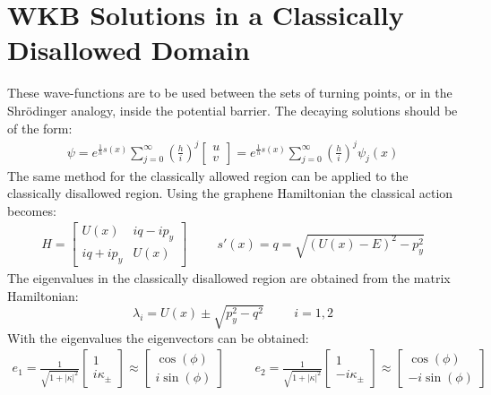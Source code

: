 		\section{WKB Solutions in a Classically Disallowed Domain}
		\label{WKB Potential Barrier - WKB Solutions in a Classicaly Disallowed Domain}
			These wave-functions are to be used between the sets of turning points, or in the Shr{\" o}dinger analogy, inside the potential barrier. The decaying solutions should be of the form:
			\begin{align}
				\psi=
				 e^{\frac{1}{h}s\left(x\right)}\sum\limits_{j=0}^\infty\left(\frac{h}{i}\right)^{j}
				\left[\begin{array}{cc}
					u\\
					v
				\end{array}\right]
				= e^{\frac{1}{h}s\left(x\right)}\sum\limits_{j=0}^\infty\left(\frac{h}{i}\right)^{j}\psi_{j}\left(x\right)
			\end{align}
			The same method for the classically allowed region can be applied to the classically disallowed region. Using the graphene Hamiltonian the classical action becomes:
			\begin{gather}
				H=
				\left[\begin{array}{cc}
					U\left(x\right)&iq-ip_{y}\\
					iq+ip_{y}&U\left(x\right)
				\end{array}\right]
				\hspace{1cm}
				s'\left(x\right)=q=\sqrt{\left(U\left(x\right)-E\right)^{2}-p_{y}^{2}}
			\end{gather}
			The eigenvalues in the classically disallowed region are obtained from the matrix Hamiltonian:
			\begin{equation}
				\lambda_{i}=U\left(x\right)\pm\sqrt{p_{y}^{2}-q^{2}}
				\hspace{1cm}
				i=1,2
			\end{equation}
			With the eigenvalues the eigenvectors can be obtained:
			\begin{align}
				e_{1}=\frac{1}{\sqrt{1+|\kappa|^{2}}}\left[\begin{array}{cc}
					1\\
					i\kappa_{\pm}
				\end{array}\right]\approx
				\left[\begin{array}{cc}
					\cos(\phi)\\
					i\sin(\phi)
				\end{array}\right]
				\hspace{1cm}
				e_{2}=\frac{1}{\sqrt{1+|\kappa|^{2}}}\left[\begin{array}{cc}
					1\\
					-i\kappa_{\pm}
				\end{array}\right]\approx
				\left[\begin{array}{cc}
					\cos(\phi)\\
					-i\sin(\phi)
				\end{array}\right]	
			\end{align}
